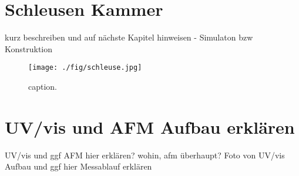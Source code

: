 \section{Schleusen Kammer}
kurz beschreiben und auf nächste Kapitel hinweisen - Simulaton bzw Konstruktion


\begin{figure}
    \centering
    \texttt{[image: ./fig/schleuse.jpg]}
    \caption{caption.}
    \label{fig:schleuse}
\end{figure}


\section{UV/vis und AFM Aufbau erklären}
UV/vis und ggf AFM hier erklären? wohin, afm überhaupt?
Foto von UV/vis Aufbau und ggf hier Messablauf erklären
